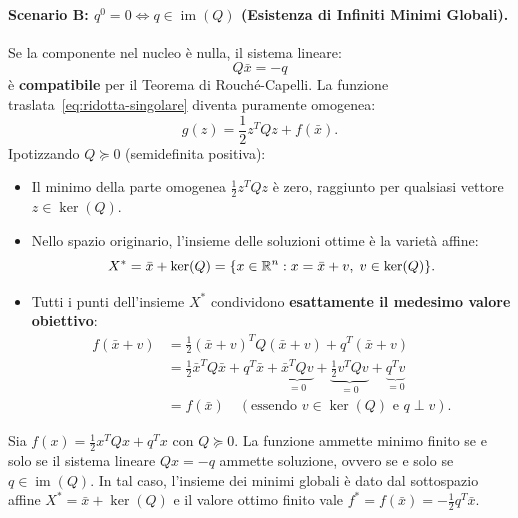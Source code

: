 \paragraph{Scenario B: $q^0 = 0 \iff q \in \operatorname{im}(Q)$ (Esistenza di Infiniti Minimi Globali).}
Se la componente nel nucleo \`e nulla, il sistema lineare:
\begin{equation}
    Q \bar{x} = -q
\end{equation}
\`e \textbf{compatibile} per il Teorema di Rouch\'e-Capelli. La funzione traslata~\eqref{eq:ridotta-singolare} diventa puramente omogenea:
\begin{equation}
    g(z) = \frac{1}{2} z^T Q z + f(\bar{x}).
\end{equation}
Ipotizzando $Q \succeq 0$ (semidefinita positiva):
\begin{itemize}
    \item Il minimo della parte omogenea $\frac{1}{2} z^T Q z$ \`e zero, raggiunto per qualsiasi vettore $z \in \ker(Q)$.
    \item Nello spazio originario, l'insieme delle soluzioni ottime \`e la variet\`a affine:
    \begin{equation}
        X^* = \bar{x} + \ker(Q) = \{x \in \mathbb{R}^n : x = \bar{x} + v, \; v \in \ker(Q)\}.
    \end{equation}
    \item Tutti i punti dell'insieme $X^*$ condividono \textbf{esattamente il medesimo valore obiettivo}:
    \begin{align}
        f(\bar{x} + v) &= \frac{1}{2} (\bar{x} + v)^T Q (\bar{x} + v) + q^T (\bar{x} + v) \nonumber \\
        &= \frac{1}{2} \bar{x}^T Q \bar{x} + q^T \bar{x} + \underbrace{\bar{x}^T Q v}_{= 0} + \underbrace{\frac{1}{2} v^T Q v}_{= 0} + \underbrace{q^T v}_{= 0} \nonumber \\
        &= f(\bar{x}) \quad (\text{essendo } v \in \ker(Q) \text{ e } q \perp v).
    \end{align}
\end{itemize}

\begin{theorem}
\label{thm:esistenza-minimo-quadratica}
Sia $f(x) = \frac{1}{2} x^T Q x + q^T x$ con $Q \succeq 0$. La funzione ammette minimo finito se e solo se il sistema lineare $Qx = -q$ ammette soluzione, ovvero se e solo se $q \in \operatorname{im}(Q)$.
In tal caso, l'insieme dei minimi globali \`e dato dal sottospazio affine $X^* = \bar{x} + \ker(Q)$ e il valore ottimo finito vale $f^* = f(\bar{x}) = -\frac{1}{2} q^T \bar{x}$.
\end{theorem}


